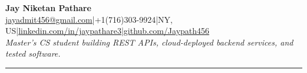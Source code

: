 \documentclass[10pt, letterpaper]{article}
\newcommand{\sectiondivider}{\vspace{0.46em}\hrule\vspace{0.43em}}
\newcommand{\rolegap}{\vspace{5.2pt}}
\begin{document}
\begin{center}
\textbf{\Large Jay Niketan Pathare} \\
\rolegap
\href{mailto:jayadmit456@gmail.com}{jayadmit456@gmail.com}\hspace{0.5em}|\hspace{0.5em}+1(716)303-9924\hspace{0.5em}|\hspace{0.5em}NY, US\hspace{0.5em}|\hspace{0.5em}\href{https://www.linkedin.com/in/jaypathare3}{linkedin.com/in/jaypathare3}\hspace{0.5em}|\hspace{0.5em}\href{https://github.com/Jaypath456}{github.com/Jaypath456} \\
\textit{Master's CS student building REST APIs, cloud-deployed backend services, and tested software.}
\end{center}
\sectiondivider
\end{document}
